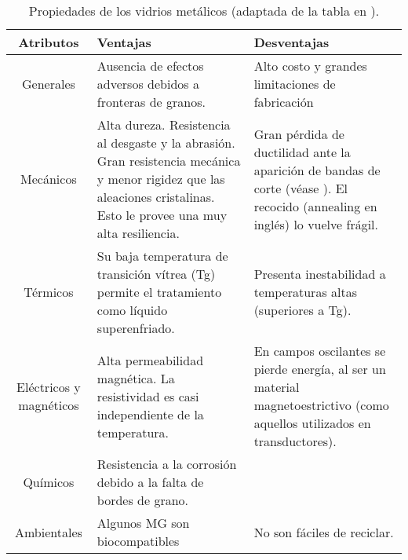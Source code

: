 \begin{table}[htp]
\begin{center}
\begin{tabular}{c C{5cm} C{5cm}}
\hline
\textbf{Atributos} & \textbf{Ventajas} & \textbf{Desventajas} \\ \hline
 \hline

Generales &
Ausencia de efectos adversos debidos a fronteras de granos. &
Alto costo y grandes limitaciones de fabricación \\ \hline
 
Mecánicos &
Alta dureza. Resistencia al desgaste y la abrasión. Gran resistencia mecánica y menor rigidez que las aleaciones cristalinas. Esto le provee una muy alta resiliencia. & 
Gran pérdida de ductilidad ante la aparición de bandas de corte (véase ). El recocido (annealing en inglés) lo vuelve frágil. \\ \hline 
 
Térmicos & 
Su baja temperatura de transición vítrea (Tg) permite el tratamiento como líquido superenfriado. & 
Presenta inestabilidad a temperaturas altas (superiores a Tg). \\ \hline

Eléctricos y magnéticos & 
Alta permeabilidad magnética. La resistividad es casi independiente de la temperatura.& 
En campos oscilantes se pierde energía, al ser un material magnetoestrictivo (como aquellos utilizados en transductores).\\ \hline

Químicos & 
Resistencia a la corrosión debido a la falta de bordes de grano.& \\ \hline

Ambientales & 
Algunos MG son biocompatibles & No son fáciles de reciclar. \\ \hline

\end{tabular}
\end{center}
\caption[Propiedades de los vidrios metálicos.]{Propiedades de los vidrios metálicos (adaptada de la tabla en \cite{ashby06}).}
\label{C1:tbl:props}
\end{table}


